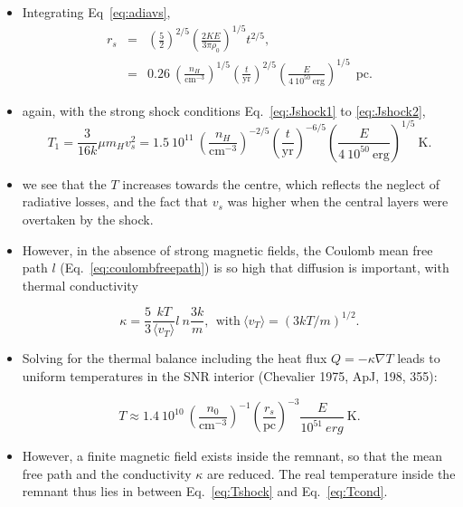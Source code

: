 \begin{itemize}

\item Integrating Eq~\ref{eq:adiavs}, 
\begin{eqnarray}
r_s  &  =  &  \left( \frac{5}{2} \right)^{2/5} \left( \frac{2KE}{3\pi
  \rho_0}  \right)^{1/5} t^{2/5} , \nonumber \\ 
     &  =  & 0.26 ~ \left( \frac{n_H}{\mathrm{cm}^{-3}}
\right)^{1/5} \left( \frac{t}{\mathrm{yr}} \right) ^{2/5} \left(
\frac{E}{4~10^{50}~\mathrm{erg}} \right)^{1/5} ~~\mathrm{pc}.  \nonumber
\end{eqnarray}

\item again, with the strong shock conditions Eq.~\ref{eq:Jshock1} to  \ref{eq:Jshock2},
\begin{equation}
T_1 = \frac{3}{16k} \mu m_H v_s^2 = 1.5~10^{11}~\left(
\frac{n_H}{\mathrm{cm}^{-3}} \right)^{-2/5} \left(
  \frac{t}{\mathrm{yr}}  \right)^{-6/5} \left(
  \frac{E}{4~10^{50}~\mathrm{erg}} \right)^{1/5} ~\mathrm{K}.  \label{eq:Tshock}
\end{equation}
\item we see that the $T$ increases towards the centre, which reflects
  the neglect of radiative losses, and the fact that $v_s$ was higher
  when the central layers were overtaken by the shock.


\end{itemize}


\begin{itemize}


\item However, in the absence of strong magnetic fields, the Coulomb
  mean free path $l$ (Eq.~\ref{eq:coulombfreepath}) is so high that
  diffusion is important, with thermal conductivity 

\begin{equation}
\kappa = \frac{5}{3} \frac{k T}{\langle v_{T} \rangle} l ~n
\frac{3k}{m}, ~~\text{with}~ \langle v_{T} \rangle = (3 k T /
m)^{1/2}. 
\end{equation}

\item Solving for the thermal balance including the heat flux $Q = -
  \kappa \nabla T$ leads to uniform temperatures in the SNR interior
  (Chevalier 1975, ApJ, 198, 355):

\begin{equation} T \approx
1.4~10^{10}~\left(\frac{n_0}{\mathrm{cm}^{-3}}\right)^{-1} \left(
\frac{r_s}{\mathrm{pc}} \right)^{-3} \frac{E}{10^{51}~erg} ~
\mathrm{K}. \label{eq:Tcond}
\end{equation}

\item However, a finite magnetic field exists inside the remnant, so
  that the mean free path and the conductivity $\kappa$ are reduced.
  The real temperature inside the remnant thus lies in between
  Eq.~\ref{eq:Tshock} and  Eq.~\ref{eq:Tcond}. 


\end{itemize}

